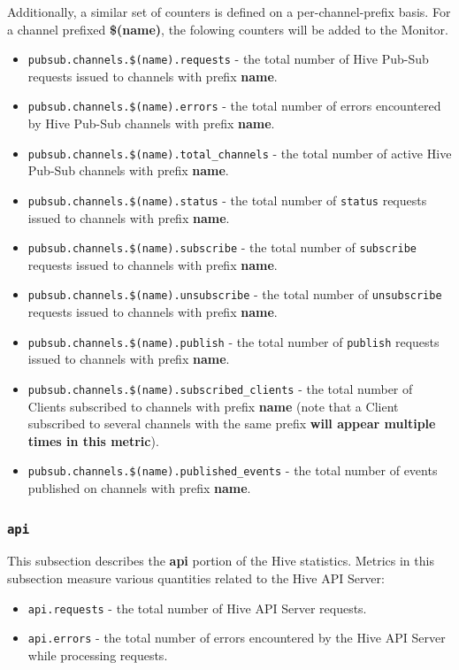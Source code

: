 \documentclass[a4paper]{article}
\begin{document}
\noindent
Additionally, a similar set of counters is defined on a per-channel-prefix basis. For a channel prefixed \textbf{\$(name)}, the folowing counters will be added to the Monitor.


\begin{itemize}
\item \texttt{pubsub.channels.\$(name).requests} - the total number of Hive Pub-Sub requests issued to channels with prefix \textbf{name}.
\item \texttt{pubsub.channels.\$(name).errors} - the total number of errors encountered by Hive Pub-Sub channels with prefix \textbf{name}.
\item \texttt{pubsub.channels.\$(name).total\_channels} - the total number of active Hive Pub-Sub channels with prefix \textbf{name}.
\item \texttt{pubsub.channels.\$(name).status} - the total number of \texttt{status} requests issued to channels with prefix \textbf{name}.
\item \texttt{pubsub.channels.\$(name).subscribe} - the total number of \texttt{subscribe} requests issued to channels with prefix \textbf{name}.
\item \texttt{pubsub.channels.\$(name).unsubscribe} - the total number of \texttt{unsubscribe} requests issued to channels with prefix \textbf{name}.
\item \texttt{pubsub.channels.\$(name).publish} - the total number of \texttt{publish} requests issued to channels with prefix \textbf{name}.
\item \texttt{pubsub.channels.\$(name).subscribed\_clients} - the total number of Clients subscribed to channels with prefix \textbf{name} (note that a Client subscribed to several channels with the same prefix \textbf{will appear multiple times in this metric}).
\item \texttt{pubsub.channels.\$(name).published\_events} - the total number of events published on channels with prefix \textbf{name}.
\end{itemize}
\subsubsection{\texttt{api}}
\label{sec-4-2-16}

This subsection describes the \textbf{api} portion of the Hive statistics. Metrics in this subsection measure various quantities related to the Hive API Server:


\begin{itemize}
\item \texttt{api.requests} - the total number of Hive API Server requests.
\item \texttt{api.errors} - the total number of errors encountered by the Hive API Server while processing requests.
\end{itemize}
\end{document}
